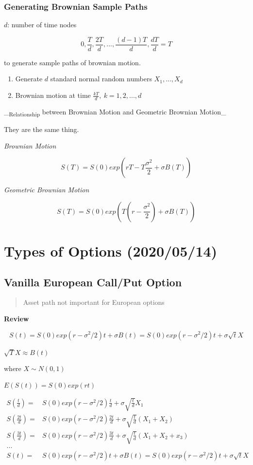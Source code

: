 \documentclass[11pt]{article}
\begin{document}
\subsubsection{Generating Brownian Sample Paths}
\label{sec:org78a9e99}

\(d\): number of time nodes

$$
0, \frac{T}{d}, \frac{2T}{d}, ..., \frac{(d - 1)T}{d}, \frac{dT}{d} = T
$$

to generate sample paths of brownian motion.

\begin{enumerate}
\item Generate \(d\) standard normal random numbers \(X_1, ..., X_d\)
\item Brownian motion at time \(\frac{kT}{d}, \ k = 1,2,...,d\)
\end{enumerate}

\_\textsubscript{Relationship} between Brownian Motion and Geometric Brownian Motion\_

They are the same thing.

\emph{Brownian Motion}

$$
S(T) = S(0) exp(rT - T\frac{\sigma^2}{2} + \sigma B(T))
$$

\emph{Geometric Brownian Motion}

$$
S(T) = S(0) exp(T(r - \frac{\sigma^2}{2}) + \sigma B(T))
$$

\section{Types of Options (2020/05/14)}
\label{sec:orgfc90928}
\subsection{Vanilla European Call/Put Option}
\label{sec:org0ddb6b2}
\begin{quote}
Asset path not important for European options
\end{quote}

\textbf{Review}

$$S(t) = S(0) exp(r - \sigma^2/2)t + \sigma B(t) = S(0) exp(r -
    \sigma^2/2)t + \sigma \sqrt{t} X$$

\(\sqrt T X \approx B(t)\)

where \(X \sim N(0,1)\)

\(E(S(t)) = S(0) exp(rt)\)

\begin{equation}
\begin{split}
S(\frac{t}{d}) = & S(0) exp(r - \sigma^2/2) \frac{t}{d} + \sigma \sqrt{\frac{t}{d}} X_1\\
S(\frac{2t}{d}) = & S(0) exp(r - \sigma^2/2) \frac{2t}{d} + \sigma \sqrt{\frac{t}{d}} (X_1 + X_2)\\
S(\frac{3t}{d}) = & S(0) exp(r - \sigma^2/2) \frac{3t}{d} + \sigma \sqrt{\frac{t}{d}} (X_1 + X_2 + x_3)\\
...\\
S(t) = & S(0) exp(r - \sigma^2/2)t + \sigma B(t) = S(0) exp(r - \sigma^2/2)t + \sigma \sqrt{t} X
\end{split}
\end{equation}
\end{document}
